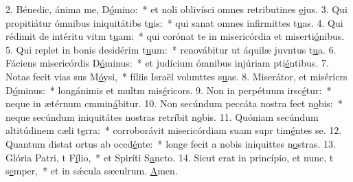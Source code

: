 2. Bénedic, ánima me, D\uline{ó}mino:~* et noli oblivísci omnes retributines \uline{e}jus.
3. Qui propitiátur ómnibus iniquitátibs t\uline{u}is:~* qui sanat omnes infirmittes t\uline{u}as.
4. Qui rédimit de intéritu vitm t\uline{u}am:~* qui corónat te in misericórdia et miserti\uline{ó}nibus.
5. Qui replet in bonis desidérim t\uline{u}um:~* renovábitur ut áquilæ juvntus t\uline{u}a.
6. Fáciens misericórdis D\uline{ó}minus:~* et judícium ómnibus injúriam pti\uline{é}ntibus.
7. Notas fecit vias sus M\uline{ó}ysi,~* fíliis Israël volunttes s\uline{u}as.
8. Miserátor, et miséricrs D\uline{ó}minus:~* longánimis et multm mis\uline{é}ricors.
9. Non in perpétuum irsc\uline{é}tur:~* neque in ætérnum cmmin\uline{á}bitur.
10. Non secúndum peccáta nostra fect n\uline{o}bis:~* neque secúndum iniquitátes nostras retríbit n\uline{o}bis.
11. Quóniam secúndum altitúdinem cæli  t\uline{e}rra:~* corroborávit misericórdiam suam supr tim\uline{é}ntes se.
12. Quantum distat ortus ab occd\uline{é}nte:~* longe fecit a nobis iniquittes n\uline{o}stras.
13. Glória Patri, t F\uline{í}lio,~* et Spiríti S\uline{a}ncto.
14. Sicut erat in princípio, et nunc, t s\uline{e}mper,~* et in sǽcula sæculrum. \uline{A}men.
